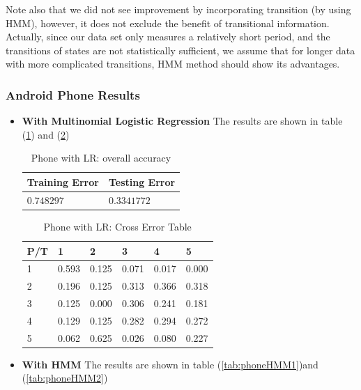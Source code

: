 Note also that we did not see improvement by incorporating transition (by using HMM), however, it does not exclude the benefit of transitional information. Actually, since our data set only measures a relatively short period, and the transitions of states are not statistically sufficient, we assume that for longer data with more complicated transitions, HMM method should show its advantages. 

\subsubsection{Android Phone Results} 
\label{subsec:phoneresult}
\begin{itemize}

\item \textbf{With Multinomial Logistic Regression} 
The results are shown in table (\ref{tab:phoneLR1}) and (\ref{tab:phoneLR2})

\begin{table}[H]
\begin{center}
\begin{tabular}{|l|l|}
      \hline
      Training Error & Testing Error\\
      \hline
      $0.748297$ & $0.3341772$ \\
      \hline
\end{tabular}
\caption{Phone with LR: overall accuracy}
\label{tab:phoneLR1}
\end{center}
\end{table}

\begin{table}[H]
\begin{center}
\begin{tabular}{|l|l|l|l|l|l|}
      \hline
      P/T& 1 & 2 &3 & 4 & 5 \\
      \hline
      1 &0.593&0.125&0.071&0.017&0.000\\
      2 &0.196&0.125&0.313&0.366&0.318\\
      3 &0.125&0.000&0.306&0.241&0.181\\
      4 &0.129&0.125&0.282&0.294&0.272\\
      5 &0.062&0.625&0.026&0.080&0.227\\
      \hline
\end{tabular}
\caption{Phone with LR: Cross Error Table}
\label{tab:phoneLR2}
\end{center}
\end{table}

\item \textbf{With HMM}
The results are shown in table (\ref{tab:phoneHMM1})and (\ref{tab:phoneHMM2})


\end{itemize}
